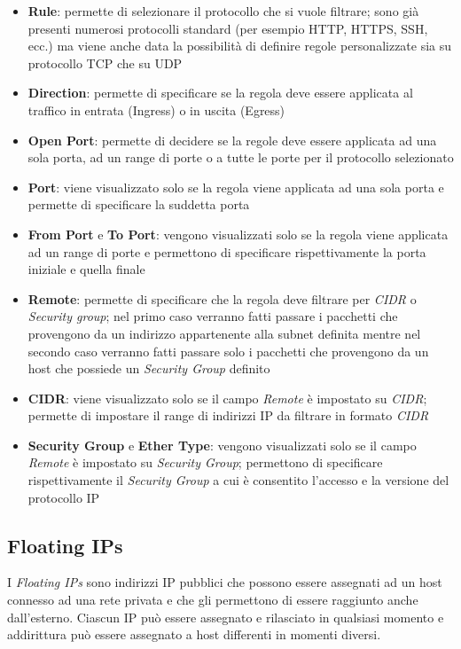 \begin{itemize}
    \item \textbf{Rule}: permette di selezionare il protocollo che si vuole filtrare; sono già presenti numerosi protocolli standard (per esempio HTTP, HTTPS, SSH, ecc.) ma viene anche data la possibilità di definire regole personalizzate sia su protocollo TCP che su UDP
    \item \textbf{Direction}: permette di specificare se la regola deve essere applicata al traffico in entrata (Ingress) o in uscita (Egress)
    \item \textbf{Open Port}: permette di decidere se la regole deve essere applicata ad una sola porta, ad un range di porte o a tutte le porte per il protocollo selezionato
    \item \textbf{Port}: viene visualizzato solo se la regola viene applicata ad una sola porta e permette di specificare la suddetta porta
    \item \textbf{From Port} e \textbf{To Port}: vengono visualizzati solo se la regola viene applicata ad un range di porte e permettono di specificare rispettivamente la porta iniziale e quella finale
    \item \textbf{Remote}: permette di specificare che la regola deve filtrare per \emph{CIDR} o \emph{Security group}; nel primo caso verranno fatti passare i pacchetti che provengono da un indirizzo appartenente alla subnet definita mentre nel secondo caso verranno fatti passare solo i pacchetti che provengono da un host che possiede un \textit{Security Group} definito
    \item \textbf{CIDR}: viene visualizzato solo se il campo \emph{Remote} è impostato su \emph{CIDR}; permette di impostare il range di indirizzi IP da filtrare in formato \emph{CIDR}
    \item \textbf{Security Group} e \textbf{Ether Type}: vengono visualizzati solo se il campo \emph{Remote} è impostato su \emph{Security Group}; permettono di specificare rispettivamente il \emph{Security Group} a cui è consentito l'accesso e la versione del protocollo IP
\end{itemize}

\subsection{Floating IPs}

I \textit{Floating IPs} sono indirizzi IP pubblici che possono essere assegnati ad un host connesso ad una rete privata e che gli permettono di essere raggiunto anche dall'esterno. Ciascun IP può essere assegnato e rilasciato in qualsiasi momento e addirittura può essere assegnato a host differenti in momenti diversi.

